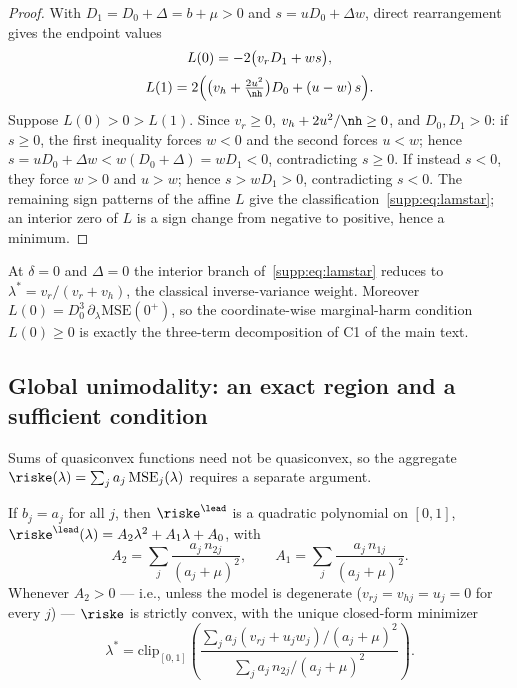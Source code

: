 \begin{proof}
With $D_1 = D_0 + \Delta = b + \mu > 0$ and $s = uD_0 + \Delta w$, direct rearrangement gives the endpoint values
\begin{equation}
\begin{gathered}
L(0) = -2\big(v_r D_1 + w s\big),
\\[2pt]
L(1) = 2\Big(\big(v_h + \tfrac{2u^2}{\nh}\big) D_0 + (u - w)\, s\Big) .
\end{gathered}
\label{supp:eq:endpoints}
\end{equation}
Suppose $L(0) > 0 > L(1)$.
Since $v_r \ge 0$, $v_h + 2u^2/\nh \ge 0$, and $D_0, D_1 > 0$: if $s \ge 0$, the first inequality forces $w < 0$ and the second forces $u < w$; hence $s = uD_0 + \Delta w < w(D_0 + \Delta) = w D_1 < 0$, contradicting $s \ge 0$.
If instead $s < 0$, they force $w > 0$ and $u > w$; hence $s > w D_1 > 0$, contradicting $s < 0$.
The remaining sign patterns of the affine $L$ give the classification~\eqref{supp:eq:lamstar}; an interior zero of $L$ is a sign change from negative to positive, hence a minimum.
\end{proof}

\begin{remark}
At $\delta = 0$ and $\Delta = 0$ the interior branch of~\eqref{supp:eq:lamstar} reduces to $\lambda^* = v_r/(v_r + v_h)$, the classical inverse-variance weight.
Moreover $L(0) = D_0^3\, \partial_\lambda \mathrm{MSE}(0^+)$, so the coordinate-wise marginal-harm condition $L(0) \ge 0$ is exactly the three-term decomposition of C1 of the main text.
\end{remark}

\subsection{Global unimodality: an exact region and a sufficient condition}

Sums of quasiconvex functions need not be quasiconvex, so the aggregate $\riske(\lambda) = \sum_j a_j\, \mathrm{MSE}_j(\lambda)$ requires a separate argument.

\begin{theorem}\label{supp:thm:quad}
If $b_j = a_j$ for all $j$, then $\riske^{\lead}$ is a quadratic polynomial on $[0,1]$, $\riske^{\lead}(\lambda) = A_2 \lambda^2 + A_1 \lambda + A_0$, with
\begin{equation}
A_2 = \sum_j \frac{a_j\, n_{2j}}{(a_j+\mu)^2},
\qquad
A_1 = \sum_j \frac{a_j\, n_{1j}}{(a_j+\mu)^2}.
\end{equation}
Whenever $A_2 > 0$ --- i.e., unless the model is degenerate ($v_{rj} = v_{hj} = u_j = 0$ for every $j$) --- $\riske$ is strictly convex, with the unique closed-form minimizer
\begin{equation}
\lambda^* = \mathrm{clip}_{[0,1]}\!\left( \frac{\sum_j a_j (v_{rj} + u_j w_j)/(a_j+\mu)^2}{\sum_j a_j\, n_{2j}/(a_j+\mu)^2} \right) .
\label{supp:eq:lamstarquad}
\end{equation}
\end{theorem}

